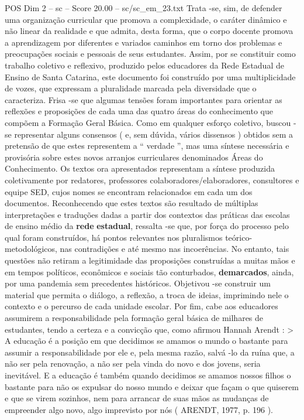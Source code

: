 \begin{textsample}{POS Dim 2 – sc – Score 20.00 – sc/sc\_em\_23.txt}
Trata -se, sim, de defender uma organização curricular que promova a complexidade, o caráter dinâmico e não linear da realidade e que admita, desta forma, que o corpo docente promova a aprendizagem por diferentes e variados caminhos em torno dos problemas e preocupações sociais e pessoais de seus estudantes.
Assim, por se constituir como trabalho coletivo e reflexivo, produzido pelos educadores da Rede Estadual de Ensino de Santa Catarina, este documento foi construído por uma multiplicidade de vozes, que expressam a pluralidade marcada pela diversidade que o caracteriza.
Frisa -se que algumas tensões foram importantes para orientar as reflexões e proposições de cada uma das quatro áreas do conhecimento que compõem a Formação Geral Básica.
Como em qualquer esforço coletivo, buscou -se representar alguns consensos ( e, sem dúvida, vários dissensos ) obtidos sem a pretensão de que estes representem a “ verdade ”, mas uma síntese necessária e provisória sobre estes novos arranjos curriculares denominados Áreas do Conhecimento.
Os textos ora apresentados representam a síntese produzida coletivamente por redatores, professores colaboradores/elaboradores, consultores e equipe SED, cujos nomes se encontram relacionados em cada um dos documentos.
Reconhecendo que estes textos são resultado de múltiplas interpretações e traduções dadas a partir dos contextos das práticas das escolas de ensino médio da \textbf{rede} \textbf{estadual}, ressalta -se que, por força do processo pelo qual foram construídos, há pontos relevantes nos pluralismos teórico-metodológicos, nas contradições e até mesmo nas incoerências.
No entanto, tais questões não retiram a legitimidade das proposições construídas a muitas mãos e em tempos políticos, econômicos e sociais tão conturbados, \textbf{demarcados}, ainda, por uma pandemia sem precedentes históricos.
Objetivou -se construir um material que permita o diálogo, a reflexão, a troca de ideias, imprimindo nele o contexto e o percurso de cada unidade escolar.
Por fim, cabe aos educadores assumirem a responsabilidade pela formação geral básica de milhares de estudantes, tendo a certeza e a convicção que, como afirmou Hannah Arendt : > A educação é a posição em que decidimos se amamos o mundo o bastante para assumir a responsabilidade por ele e, pela mesma razão, salvá -lo da ruína que, a não ser pela renovação, a não ser pela vinda do novo e dos jovens, seria inevitável.
E a educação é também quando decidimos se amamos nossos filhos o bastante para não os expulsar do nosso mundo e deixar que façam o que quiserem e que se virem sozinhos, nem para arrancar de suas mãos as mudanças de empreender algo novo, algo imprevisto por nós ( ARENDT, 1977, p. 196 ).

\end{textsample}
